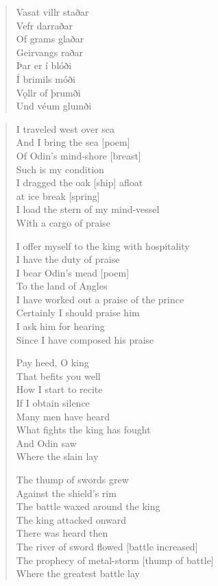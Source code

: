 \begin{paracol}{2}
\begin{quote}
        Vasat villr staðar\\
        Vefr darraðar\\
        Of grams glaðar\\
        Geirvangs raðar\\
        Þar er í blóði\\
        Í brimils móði\\
        Vǫllr of þrumði\\
        Und véum glumði
    \end{quote}
    \switchcolumn
    \begin{quote}
        I traveled west over sea\\
        And I bring the sea [poem]\\
        Of Odin's mind-shore [breast] \\
        Such is my condition\\
        I dragged the oak [ship] afloat\\
        at ice break [spring]\\
        I load the stern of my mind-vessel\\
        With a cargo of praise

        I offer myself to the king with hospitality\\
        I have the duty of praise\\
        I bear Odin's mead [poem]\\
        To the land of Angles\\
        I have worked out a praise of the prince\\
        Certainly I should praise him\\
        I ask him for hearing\\
        Since I have composed his praise

        Pay heed, O king\\
        That befits you well\\
        How I start to recite\\
        If I obtain silence\\
        Many men have heard \\
        What fights the king has fought\\
        And Odin saw\\
        Where the slain lay

        The thump of swords grew\\
        Against the shield's rim\\
        The battle waxed around the king\\
        The king attacked onward\\
        There was heard then\\
        The river of sword flowed [battle increased]\\
        The prophecy of metal-storm [thump of battle]\\
        Where the greatest battle lay


\end{quote}
\end{paracol}
